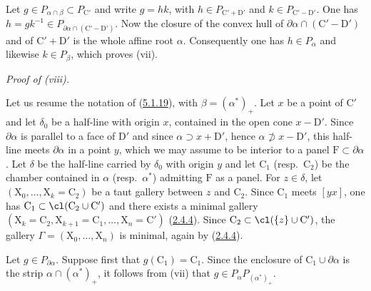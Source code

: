 \documentclass[12pt,a4paper,oneside,english]{smfart}
\makeatletter
\newcommand{\btanchor}[1]{\leavevmode\Hy@raisedlink{\hypertarget{bt:#1}{}}}
\newcommand{\btref}[1]{\hyperlink{bt:#1}{#1}}
\theoremstyle{definition}
\theoremstyle{bt}
\makeatother
\begin{document}
Let $g\in P_{\alpha\cap\beta}\subset P_{\mathrm{C}'}$ and write $g=hk$, with
$h\in P_{\mathrm{C}'+\mathrm{D}'}$ and $k\in P_{\mathrm{C}'-\mathrm{D}'}$. One
has $h=gk^{-1}\in P_{\partial\alpha\cap(\mathrm{C}'-\mathrm{D}')}$. Now the
closure of the convex hull of $\partial\alpha\cap(\mathrm{C}'-\mathrm{D}')$ and
of $\mathrm{C}'+\mathrm{D}'$ is the whole affine root $\alpha$. Consequently one
has $h\in P_{\alpha}$ and likewise $k\in P_{\beta}$, which proves (vii).

\btanchor{5.1.20}
\emph{Proof of \textup{(viii)}.}

Let us resume the notation of (\btref{5.1.19}), with $\beta=(\alpha^{*})_{+}$. Let $x$
be a point of $\mathrm{C}'$ and let $\delta_{0}$ be a half-line with origin $x$,
contained in the open cone $x-\mathrm{D}'$. Since $\partial\alpha$ is parallel
to a face of $\mathrm{D}'$ and since $\alpha\supset x+\mathrm{D}'$, hence
$\alpha\not\supset x-\mathrm{D}'$, this half-line meets $\partial\alpha$ in a
point $y$, which we may assume to be interior to a panel
$\mathrm{F}\subset\partial\alpha$. Let $\delta$ be the half-line carried by
$\delta_{0}$ with origin $y$ and let $\mathrm{C}_{1}$ (resp.\ $\mathrm{C}_{2}$)
be the chamber contained in $\alpha$ (resp.\ $\alpha^{*}$) admitting
$\mathrm{F}$ as a panel. For $z\in\delta$, let
$(\mathrm{X}_{0},\dots,\mathrm{X}_{k}=\mathrm{C}_{2})$ be a taut gallery between
$z$ and $\mathrm{C}_{2}$. Since $\mathrm{C}_{1}$ meets $[yx]$, one has
$\mathrm{C}_{1}\subset\cl(\mathrm{C}_{2}\cup \mathrm{C}')$ and there exists a
minimal gallery
$(\mathrm{X}_{k}=\mathrm{C}_{2},\mathrm{X}_{k+1}=\mathrm{C}_{1},\dots,\mathrm{X}_{n}=\mathrm{C}')$
(\btref{2.4.4}). Since $\mathrm{C}_{2}\subset\cl(\{z\}\cup \mathrm{C}')$, the gallery
$\Gamma=(\mathrm{X}_{0},\dots,\mathrm{X}_{n})$ is minimal, again by (\btref{2.4.4}).

Let $g\in P_{\partial\alpha}$. Suppose first that
$g(\mathrm{C}_{1})=\mathrm{C}_{1}$. Since the enclosure of
$\mathrm{C}_{1}\cup\partial\alpha$ is the strip $\alpha\cap(\alpha^{*})_{+}$, it
follows from (vii) that $g\in P_{\alpha}P_{(\alpha^{*})_{+}}$.
\end{document}

